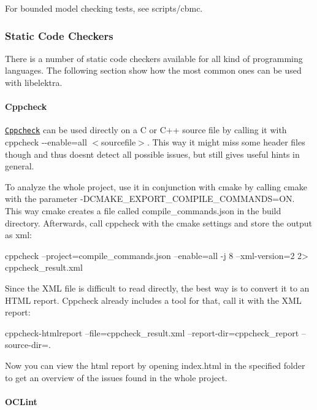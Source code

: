 For bounded model checking tests, see {\ttfamily scripts/cbmc}.

\subsubsection*{Static Code Checkers}

There is a number of static code checkers available for all kind of programming languages. The following section show how the most common ones can be used with {\ttfamily libelektra}.

\paragraph*{Cppcheck}

\href{http://cppcheck.sourceforge.net/}{\tt Cppcheck} can be used directly on a C or C++ source file by calling it with {\ttfamily cppcheck -\/-\/enable=all $<$sourcefile$>$}. This way it might miss some header files though and thus doesn\textquotesingle{}t detect all possible issues, but still gives useful hints in general.

To analyze the whole project, use it in conjunction with {\ttfamily cmake} by calling {\ttfamily cmake} with the parameter {\ttfamily -\/\+D\+C\+M\+A\+K\+E\+\_\+\+E\+X\+P\+O\+R\+T\+\_\+\+C\+O\+M\+P\+I\+L\+E\+\_\+\+C\+O\+M\+M\+A\+N\+DS=ON}. This way {\ttfamily cmake} creates a file called {\ttfamily compile\+\_\+commands.\+json} in the build directory. Afterwards, call {\ttfamily cppcheck} with the cmake settings and store the output as xml\+: \begin{DoxyVerb}cppcheck --project=compile_commands.json --enable=all -j 8 --xml-version=2 2> cppcheck_result.xml
\end{DoxyVerb}


Since the X\+ML file is difficult to read directly, the best way is to convert it to an H\+T\+ML report. Cppcheck already includes a tool for that, call it with the X\+ML report\+: \begin{DoxyVerb}cppcheck-htmlreport --file=cppcheck_result.xml --report-dir=cppcheck_report --source-dir=.
\end{DoxyVerb}


Now you can view the html report by opening {\ttfamily index.\+html} in the specified folder to get an overview of the issues found in the whole project.

\paragraph*{O\+C\+Lint}

